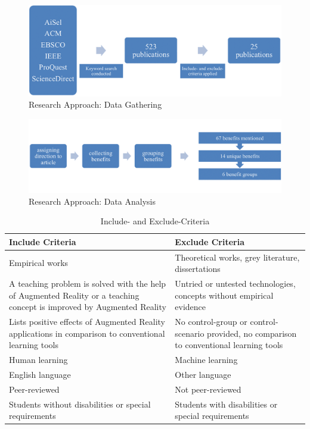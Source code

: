 \begin{figure}[ptbh]
    \centering
    \includegraphics[width=\linewidth]{figures/research_approach_part_1.png}
    \caption[Research Approach: Data Gathering]{Research Approach: Data Gathering}
    \label{fig:ResearchApproachGathering}
\end{figure}

\begin{figure}[ptbh]
    \centering
    \includegraphics[width=\linewidth]{figures/research_approach_part_2.png}
    \caption[Research Approach: Data Analysis]{Research Approach: Data Analysis}
    \label{fig:ResearchApproachAnalysis}
\end{figure}

\begin{table}[ptbh]
    \center
    \vspace{1em}
    \begin{tabular}{p{17em} | p{17em}}
        \textbf{Include Criteria} & \textbf{Exclude Criteria} \\
        \hline
        Empirical works & Theoretical works, grey literature, dissertations \\
        A teaching problem is solved with the help of Augmented Reality or a teaching concept is improved by Augmented Reality & Untried or untested technologies, concepts without empirical evidence \\
        Lists positive effects of Augmented Reality applications in comparison to conventional learning tools & No control-group or control-scenario provided, no comparison to conventional learning tools \\
        Human learning & Machine learning \\
        English language & Other language \\
        Peer-reviewed & Not peer-reviewed \\
        Students without disabilities or special requirements & Students with disabilities or special requirements \\
    \end{tabular}
    \caption[Include- and Exclude-Criteria]{Include- and Exclude-Criteria}
    \label{tab:IncludeExcludeCriteria}
\end{table}

